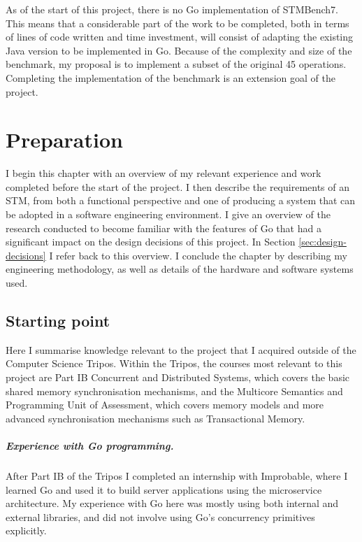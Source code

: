 \documentclass[12pt,a4paper,oneside,openright]{report}
\begin{document}
As of the start of this project, there is no Go implementation of
STMBench7. This means that a considerable part of the work to be
completed, both in terms of lines of code written and time investment,
will consist of adapting the existing Java version to be implemented
in Go. Because of the complexity and size of the benchmark, my
proposal is to implement a subset of the original 45
operations. Completing the implementation of the benchmark is an
extension goal of the project.


\chapter{Preparation}

I begin this chapter with an overview of my relevant experience and
work completed before the start of the project. I then describe the
requirements of an STM, from both a functional perspective and one of
producing a system that can be adopted in a software engineering
environment. I give an overview of the research conducted to become
familiar with the features of Go that had a significant impact on the
design decisions of this project. In Section
\ref{sec:design-decisions} I refer back to this overview. I conclude
the chapter by describing my engineering methodology, as well as
details of the hardware and software systems used.

\section{Starting point}
\label{sec:prep:starting-point}

Here I summarise knowledge relevant to the project that I acquired
outside of the Computer Science Tripos. Within the Tripos, the courses
most relevant to this project are Part IB Concurrent and Distributed
Systems, which covers the basic shared memory synchronisation
mechanisms, and the Multicore Semantics and Programming Unit of
Assessment, which covers memory models and more advanced
synchronisation mechanisms such as Transactional Memory.

\paragraph{Experience with Go programming.} After Part IB of the
Tripos I completed an internship with Improbable, where I learned Go
and used it to build server applications using the microservice
architecture. My experience with Go here was mostly using both
internal and external libraries, and did not involve using Go's
concurrency primitives explicitly.
\end{document}
